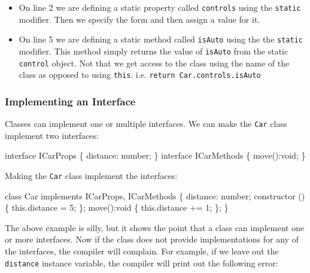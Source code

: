 \documentclass[12pt,]{article}
\newenvironment{Shaded}{}{}
\newcommand{\KeywordTok}[1]{\textcolor[rgb]{0.00,0.00,1.00}{{#1}}}
\newcommand{\DataTypeTok}[1]{{#1}}
\newcommand{\DecValTok}[1]{{#1}}
\newcommand{\FunctionTok}[1]{{#1}}
\newcommand{\NormalTok}[1]{{#1}}
\providecommand{\tightlist}{%
  \setlength{\itemsep}{0pt}\setlength{\parskip}{0pt}}
\begin{document}
\begin{itemize}
\tightlist
\item
  On line 2 we are defining a static property called \texttt{controls}
  using the \texttt{static} modifier. Then we specify the form and then
  assign a value for it.
\item
  On line 5 we are defining a static method called \texttt{isAuto} using
  the the \texttt{static} modifier. This method simply returns the value
  of \texttt{isAuto} from the static \texttt{control} object. Not that
  we get access to the class using the name of the class as opposed to
  using \texttt{this}. i.e. \texttt{return\ Car.controls.isAuto}
\end{itemize}

\subsubsection{Implementing an
Interface}\label{implementing-an-interface}

Classes can implement one or multiple interfaces. We can make the
\texttt{Car} class implement two interfaces:

\begin{Shaded}
\begin{Highlighting}[numbers=left,,]
\KeywordTok{interface} \NormalTok{ICarProps \{}
  \NormalTok{distance: number;}
\NormalTok{\}}
\KeywordTok{interface} \NormalTok{ICarMethods \{}
  \FunctionTok{move}\NormalTok{():}\DataTypeTok{void}\NormalTok{;}
\NormalTok{\}}
\end{Highlighting}
\end{Shaded}

Making the \texttt{Car} class implement the interfaces:

\begin{Shaded}
\begin{Highlighting}[numbers=left,,]
\KeywordTok{class} \NormalTok{Car }\KeywordTok{implements} \NormalTok{ICarProps, ICarMethods \{}
  \NormalTok{distance: number;}
  \FunctionTok{constructor} \NormalTok{() \{}
    \KeywordTok{this}\NormalTok{.}\FunctionTok{distance} \NormalTok{= }\DecValTok{5}\NormalTok{;}
  \NormalTok{\};}
  \FunctionTok{move}\NormalTok{():}\DataTypeTok{void} \NormalTok{\{}
    \KeywordTok{this}\NormalTok{.}\FunctionTok{distance} \NormalTok{+= }\DecValTok{1}\NormalTok{;}
  \NormalTok{\};}
\NormalTok{\}}
\end{Highlighting}
\end{Shaded}

The above example is silly, but it shows the point that a class can
implement one or more interfaces. Now if the class does not provide
implementations for any of the interfaces, the compiler will complain.
For example, if we leave out the \texttt{distance} instance variable,
the compiler will print out the following error:
\end{document}
